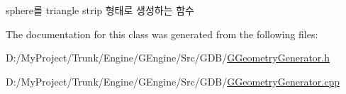 \begin{DoxyItemize}
\item sphere를 triangle strip 형태로 생성하는 함수 
\end{DoxyItemize}

The documentation for this class was generated from the following files\+:\begin{DoxyCompactItemize}
\item 
D\+:/\+My\+Project/\+Trunk/\+Engine/\+G\+Engine/\+Src/\+G\+D\+B/\hyperlink{_g_geometry_generator_8h}{G\+Geometry\+Generator.\+h}\item 
D\+:/\+My\+Project/\+Trunk/\+Engine/\+G\+Engine/\+Src/\+G\+D\+B/\hyperlink{_g_geometry_generator_8cpp}{G\+Geometry\+Generator.\+cpp}\end{DoxyCompactItemize}
